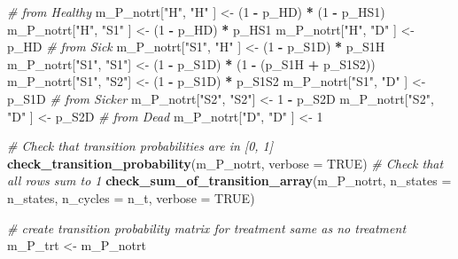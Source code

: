 \documentclass[
]{article}
\newenvironment{Shaded}{\begin{snugshade}}{\end{snugshade}}
\newcommand{\CommentTok}[1]{\textcolor[rgb]{0.56,0.35,0.01}{\textit{#1}}}
\newcommand{\DataTypeTok}[1]{\textcolor[rgb]{0.13,0.29,0.53}{#1}}
\newcommand{\DecValTok}[1]{\textcolor[rgb]{0.00,0.00,0.81}{#1}}
\newcommand{\KeywordTok}[1]{\textcolor[rgb]{0.13,0.29,0.53}{\textbf{#1}}}
\newcommand{\NormalTok}[1]{#1}
\newcommand{\OperatorTok}[1]{\textcolor[rgb]{0.81,0.36,0.00}{\textbf{#1}}}
\newcommand{\OtherTok}[1]{\textcolor[rgb]{0.56,0.35,0.01}{#1}}
\newcommand{\StringTok}[1]{\textcolor[rgb]{0.31,0.60,0.02}{#1}}
\begin{document}
\begin{Shaded}
\begin{Highlighting}[]
\CommentTok{# from Healthy}
\NormalTok{m_P_notrt[}\StringTok{"H"}\NormalTok{, }\StringTok{"H"}\NormalTok{  ] <-}\StringTok{ }\NormalTok{(}\DecValTok{1} \OperatorTok{-}\StringTok{ }\NormalTok{p_HD) }\OperatorTok{*}\StringTok{ }\NormalTok{(}\DecValTok{1} \OperatorTok{-}\StringTok{ }\NormalTok{p_HS1)}
\NormalTok{m_P_notrt[}\StringTok{"H"}\NormalTok{, }\StringTok{"S1"}\NormalTok{ ] <-}\StringTok{ }\NormalTok{(}\DecValTok{1} \OperatorTok{-}\StringTok{ }\NormalTok{p_HD) }\OperatorTok{*}\StringTok{ }\NormalTok{p_HS1}
\NormalTok{m_P_notrt[}\StringTok{"H"}\NormalTok{, }\StringTok{"D"}\NormalTok{  ] <-}\StringTok{ }\NormalTok{p_HD}
\CommentTok{# from Sick}
\NormalTok{m_P_notrt[}\StringTok{"S1"}\NormalTok{, }\StringTok{"H"}\NormalTok{ ] <-}\StringTok{ }\NormalTok{(}\DecValTok{1} \OperatorTok{-}\StringTok{ }\NormalTok{p_S1D) }\OperatorTok{*}\StringTok{ }\NormalTok{p_S1H}
\NormalTok{m_P_notrt[}\StringTok{"S1"}\NormalTok{, }\StringTok{"S1"}\NormalTok{] <-}\StringTok{ }\NormalTok{(}\DecValTok{1} \OperatorTok{-}\StringTok{ }\NormalTok{p_S1D) }\OperatorTok{*}\StringTok{ }\NormalTok{(}\DecValTok{1} \OperatorTok{-}\StringTok{ }\NormalTok{(p_S1H }\OperatorTok{+}\StringTok{ }\NormalTok{p_S1S2))}
\NormalTok{m_P_notrt[}\StringTok{"S1"}\NormalTok{, }\StringTok{"S2"}\NormalTok{] <-}\StringTok{ }\NormalTok{(}\DecValTok{1} \OperatorTok{-}\StringTok{ }\NormalTok{p_S1D) }\OperatorTok{*}\StringTok{ }\NormalTok{p_S1S2}
\NormalTok{m_P_notrt[}\StringTok{"S1"}\NormalTok{, }\StringTok{"D"}\NormalTok{ ] <-}\StringTok{ }\NormalTok{p_S1D}
\CommentTok{# from Sicker}
\NormalTok{m_P_notrt[}\StringTok{"S2"}\NormalTok{, }\StringTok{"S2"}\NormalTok{] <-}\StringTok{ }\DecValTok{1} \OperatorTok{-}\StringTok{ }\NormalTok{p_S2D}
\NormalTok{m_P_notrt[}\StringTok{"S2"}\NormalTok{, }\StringTok{"D"}\NormalTok{ ] <-}\StringTok{ }\NormalTok{p_S2D}
\CommentTok{# from Dead}
\NormalTok{m_P_notrt[}\StringTok{"D"}\NormalTok{, }\StringTok{"D"}\NormalTok{  ] <-}\StringTok{ }\DecValTok{1}

\CommentTok{# Check that transition probabilities are in [0, 1]}
\KeywordTok{check_transition_probability}\NormalTok{(m_P_notrt, }\DataTypeTok{verbose =} \OtherTok{TRUE}\NormalTok{)}
\CommentTok{# Check that all rows sum to 1}
\KeywordTok{check_sum_of_transition_array}\NormalTok{(m_P_notrt, }\DataTypeTok{n_states =}\NormalTok{ n_states, }\DataTypeTok{n_cycles =}\NormalTok{ n_t, }\DataTypeTok{verbose =} \OtherTok{TRUE}\NormalTok{)}

\CommentTok{# create transition probability matrix for treatment same as no treatment}
\NormalTok{m_P_trt <-}\StringTok{ }\NormalTok{m_P_notrt}
\end{Highlighting}
\end{Shaded}
\end{document}
